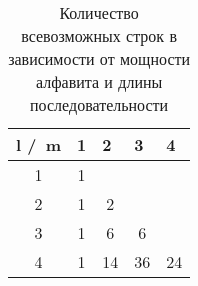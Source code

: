 \begin{table}[all_strings_count]
\centering
\caption{Количество всевозможных строк в зависимости от мощности алфавита и длины последовательности}
\label{}
\begin{tabular}{@{}|c|c|ccc@{}}
\toprule
\multicolumn{1}{|l|}{l /\ m} & \multicolumn{1}{l|}{1} & \multicolumn{1}{l|}{2} & \multicolumn{1}{l|}{3} & \multicolumn{1}{l|}{4} \\ \midrule
1                         & 1                      &                        &                        &                        \\ \cmidrule(r){1-3}
2                         & 1                      & \multicolumn{1}{c|}{2} &                        &                        \\ \cmidrule(r){1-4}
3                         & 1                      & \multicolumn{1}{c|}{6} & \multicolumn{1}{c|}{6} &                        \\ \midrule
4                         & 1                      & \multicolumn{1}{c|}{14} & \multicolumn{1}{c|}{36} & \multicolumn{1}{c|}{24} \\ \bottomrule
\end{tabular}
\end{table}


